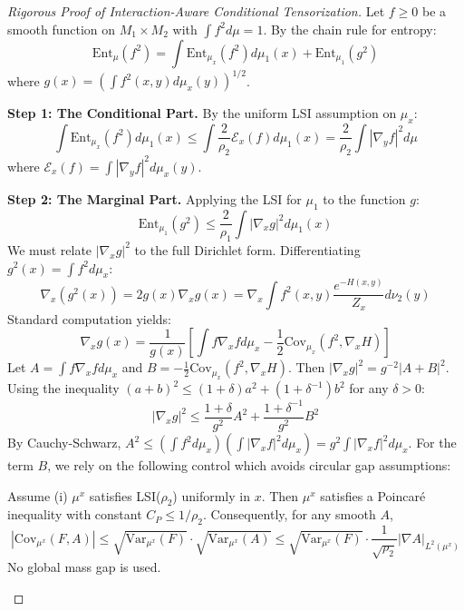 \begin{theorem}
\begin{proof}[Rigorous Proof of Interaction-Aware Conditional Tensorization]
Let $f \ge 0$ be a smooth function on $M_1 \times M_2$ with $\int f^2 d\mu = 1$. By the chain rule for entropy:
\begin{equation}
\mathrm{Ent}_\mu(f^2) = \int \mathrm{Ent}_{\mu_x}(f^2) d\mu_1(x) + \mathrm{Ent}_{\mu_1}(g^2)
\end{equation}
where $g(x) = \left(\int f^2(x,y) d\mu_x(y)\right)^{1/2}$.

\textbf{Step 1: The Conditional Part.}
By the uniform LSI assumption on $\mu_x$:
\begin{equation}
\int \mathrm{Ent}_{\mu_x}(f^2) d\mu_1(x) \le \int \frac{2}{\rho_2} \mathcal{E}_x(f) d\mu_1(x) = \frac{2}{\rho_2} \int |\nabla_y f|^2 d\mu
\end{equation}
where $\mathcal{E}_x(f) = \int |\nabla_y f|^2 d\mu_x(y)$.

\textbf{Step 2: The Marginal Part.}
Applying the LSI for $\mu_1$ to the function $g$:
\begin{equation}
\mathrm{Ent}_{\mu_1}(g^2) \le \frac{2}{\rho_1} \int |\nabla_x g|^2 d\mu_1(x)
\end{equation}
We must relate $|\nabla_x g|^2$ to the full Dirichlet form. Differentiating $g^2(x) = \int f^2 d\mu_x$:
\begin{equation}
\nabla_x (g^2(x)) = 2g(x) \nabla_x g(x) = \nabla_x \int f^2(x,y) \frac{e^{-H(x,y)}}{Z_x} d\nu_2(y)
\end{equation}
Standard computation yields:
\begin{equation}
\nabla_x g(x) = \frac{1}{g(x)} \left[ \int f \nabla_x f d\mu_x - \frac{1}{2} \mathrm{Cov}_{\mu_x}(f^2, \nabla_x H) \right]
\end{equation}
Let $A = \int f \nabla_x f d\mu_x$ and $B = -\frac{1}{2} \mathrm{Cov}_{\mu_x}(f^2, \nabla_x H)$.
Then $|\nabla_x g|^2 = g^{-2} |A+B|^2$.
Using the inequality $(a+b)^2 \le (1+\delta)a^2 + (1+\delta^{-1})b^2$ for any $\delta > 0$:
\begin{equation}
|\nabla_x g|^2 \le \frac{1+\delta}{g^2} A^2 + \frac{1+\delta^{-1}}{g^2} B^2
\end{equation}
By Cauchy-Schwarz, $A^2 \le (\int f^2 d\mu_x) (\int |\nabla_x f|^2 d\mu_x) = g^2 \int |\nabla_x f|^2 d\mu_x$.
For the term $B$, we rely on the following control which avoids circular gap assumptions:

\begin{lemma}
Assume (i) $\mu^x$ satisfies LSI($\rho_2$) uniformly in $x$. Then $\mu^x$ satisfies a Poincaré inequality with constant $C_P \le 1/\rho_2$. Consequently, for any smooth $A$,
\begin{equation}
|\mathrm{Cov}_{\mu^x}(F,A)| \le \sqrt{\mathrm{Var}_{\mu^x}(F)} \cdot \sqrt{\mathrm{Var}_{\mu^x}(A)} 
\le \sqrt{\mathrm{Var}_{\mu^x}(F)} \cdot \frac{1}{\sqrt{\rho_2}}|\nabla A|_{L^2(\mu^x)}
\end{equation}
No global mass gap is used.
\end{lemma}


\end{proof}
\end{theorem}
